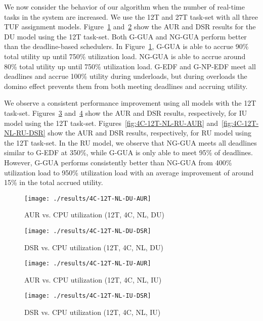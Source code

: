 \documentclass[12pt,dvips]{report}
\begin{document}
We now consider the behavior of our algorithm when the number of real-time tasks in the system are increased. We use the 12T and 27T task-set with all three TUF assignment models. Figure~\ref{fig:4C-12T-NL-DU-AUR} and~\ref{fig:4C-12T-NL-DU-DSR} show the AUR and DSR results for the DU model using the 12T task-set. Both G-GUA and NG-GUA perform better than the deadline-based schedulers. In Figure~\ref{fig:4C-12T-NL-DU-AUR}, G-GUA is able to accrue 90\% total utility up until 750\% utilization load. NG-GUA is able to accrue around 80\% total utility up until 750\% utilization load. G-EDF and G-NP-EDF meet all deadlines and accrue 100\% utility during underloads, but during overloads the domino effect prevents them from both meeting deadlines and accruing utility. 

We observe a consistent performance improvement using all models with the 12T task-set. Figures~\ref{fig:4C-12T-NL-IU-AUR} and~\ref{fig:4C-12T-NL-IU-DSR} show the AUR and DSR results, respectively, for IU model using the 12T task-set. Figures~\ref{fig:4C-12T-NL-RU-AUR} and~\ref{fig:4C-12T-NL-RU-DSR} show the AUR and DSR results, respectively, for RU model using the 12T task-set. In the RU model, we observe that NG-GUA meets all deadlines similar to G-EDF at 350\%, while G-GUA is only able to meet 95\% of deadlines. However, G-GUA performs consistently better than NG-GUA from 400\% utilization load to 950\% utilization load with an average improvement of around 15\% in the total accrued utility.


\begin{figure} [htbp]
  \centering
  \texttt{[image: ./results/4C-12T-NL-DU-AUR]}
  \caption{AUR vs. CPU utilization (12T, 4C, NL, DU)}
  \label{fig:4C-12T-NL-DU-AUR}
\end{figure}
 

\begin{figure} [htbp]
  \centering
  \texttt{[image: ./results/4C-12T-NL-DU-DSR]}
  \caption{DSR vs. CPU utilization (12T, 4C, NL, DU)}
  \label{fig:4C-12T-NL-DU-DSR}
\end{figure}
 
 
 
\begin{figure} [htbp]
  \centering
  \texttt{[image: ./results/4C-12T-NL-IU-AUR]}
  \caption{AUR vs. CPU utilization (12T, 4C, NL, IU)}
  \label{fig:4C-12T-NL-IU-AUR}
\end{figure}
 
 
 
\begin{figure} [htbp]
  \centering
  \texttt{[image: ./results/4C-12T-NL-IU-DSR]}
  \caption{DSR vs. CPU utilization (12T, 4C, NL, IU)}
  \label{fig:4C-12T-NL-IU-DSR}
\end{figure}
 
\end{document}
